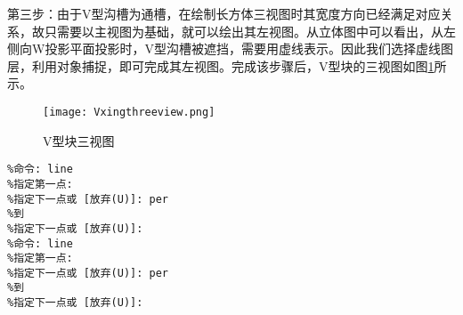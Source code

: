 第三步：由于V型沟槽为通槽，在绘制长方体三视图时其宽度方向已经满足对应关系，故只需要以主视图为基础，就可以绘出其左视图。从立体图中可以看出，从左侧向W投影平面投影时，V型沟槽被遮挡，需要用虚线表示。因此我们选择虚线图层，利用对象捕捉，即可完成其左视图。完成该步骤后，V型块的三视图如图\ref{fig:Vxingthreeview}所示。
\begin{figure}[htpb]
\centering
\texttt{[image: Vxingthreeview.png]}
\caption{V型块三视图}\label{fig:Vxingthreeview}
\end{figure}
\begin{lstlisting}
%命令: line 
%指定第一点:
%指定下一点或 [放弃(U)]: per
%到
%指定下一点或 [放弃(U)]:
%命令: line 
%指定第一点:
%指定下一点或 [放弃(U)]: per
%到
%指定下一点或 [放弃(U)]:
\end{lstlisting}
\endinput